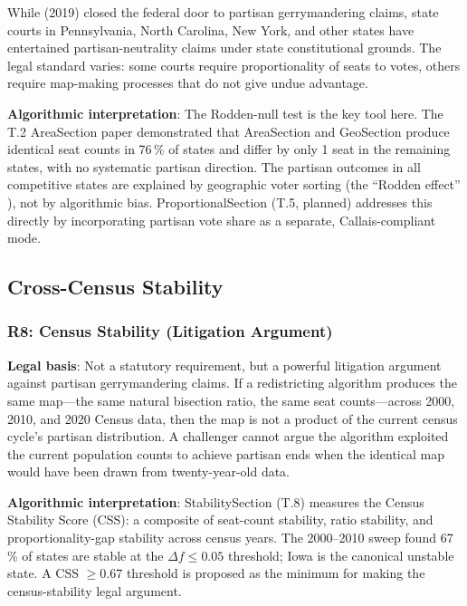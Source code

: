 While \rucho{} (2019) closed the federal door to partisan gerrymandering claims,
state courts in Pennsylvania, North Carolina, New York, and other states have
entertained partisan-neutrality claims under state constitutional grounds.
The legal standard varies: some courts require proportionality of seats to votes,
others require map-making processes that do not give undue advantage.

\textbf{Algorithmic interpretation}: The Rodden-null test is the key tool here.
The T.2 AreaSection paper demonstrated that AreaSection and GeoSection produce
identical seat counts in 76\,\% of states and differ by only 1 seat in the
remaining states, with no systematic partisan direction.
The partisan outcomes in all competitive states are explained by geographic
voter sorting (the ``Rodden effect'' \citep{rodden2019}), not by algorithmic bias.
ProportionalSection (T.5, planned) addresses this directly by incorporating
partisan vote share as a separate, Callais-compliant mode.

\subsection{Cross-Census Stability}

\subsubsection*{R8: Census Stability (Litigation Argument)}

\textbf{Legal basis}: Not a statutory requirement, but a powerful litigation
argument against partisan gerrymandering claims.
If a redistricting algorithm produces the same map---the same natural bisection
ratio, the same seat counts---across 2000, 2010, and 2020 Census data, then
the map is not a product of the current census cycle's partisan distribution.
A challenger cannot argue the algorithm exploited the current population counts
to achieve partisan ends when the identical map would have been drawn from
twenty-year-old data.

\textbf{Algorithmic interpretation}: StabilitySection (T.8) measures the Census
Stability Score (CSS): a composite of seat-count stability, ratio stability, and
proportionality-gap stability across census years.
The 2000--2010 sweep found 67\,\% of states are stable at the $\Delta f \leq 0.05$
threshold; Iowa is the canonical unstable state.
A CSS $\geq 0.67$ threshold is proposed as the minimum for making the
census-stability legal argument.

